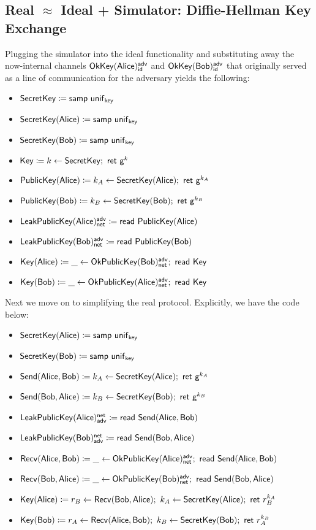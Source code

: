 \subsection{Real $\approx$ Ideal + Simulator: Diffie-Hellman Key Exchange}
Plugging the simulator into the ideal functionality and substituting away the now-internal channels $\mathsf{OkKey}(\mathsf{Alice})^{\mathsf{adv}}_{\mathsf{id}}$ and $\mathsf{OkKey}(\mathsf{Bob})^{\mathsf{adv}}_{\mathsf{id}}$ that originally served as a line of communication for the adversary yields the following:

\begin{itemize}
\item $\mathsf{SecretKey} \coloneqq \mathsf{samp} \ \mathsf{unif}_{\mathsf{key}}$
\item $\mathsf{SecretKey}(\mathsf{Alice}) \coloneqq \mathsf{samp} \ \mathsf{unif}_{\mathsf{key}}$
\item $\mathsf{SecretKey}(\mathsf{Bob}) \coloneqq \mathsf{samp} \ \mathsf{unif}_{\mathsf{key}}$
\item $\mathsf{Key} \coloneqq k \leftarrow \mathsf{SecretKey}; \ \mathsf{ret} \ \mathsf{g}^k$
\item $\mathsf{PublicKey}(\mathsf{Alice}) \coloneqq k_A \leftarrow \mathsf{SecretKey}(\mathsf{Alice}); \ \mathsf{ret} \ \mathsf{g}^{k_A}$
\item $\mathsf{PublicKey}(\mathsf{Bob}) \coloneqq k_B \leftarrow \mathsf{SecretKey}(\mathsf{Bob}); \ \mathsf{ret} \ \mathsf{g}^{k_B}$
\item $\mathsf{LeakPublicKey}(\mathsf{Alice})^{\mathsf{adv}}_{\mathsf{net}} \coloneqq \mathsf{read} \ \mathsf{PublicKey}(\mathsf{Alice})$
\item $\mathsf{LeakPublicKey}(\mathsf{Bob})^{\mathsf{adv}}_{\mathsf{net}} \coloneqq \mathsf{read} \ \mathsf{PublicKey}(\mathsf{Bob})$
\item $\mathsf{Key}(\mathsf{Alice}) \coloneqq \_ \leftarrow \mathsf{OkPublicKey}(\mathsf{Bob})^{\mathsf{adv}}_{\mathsf{net}}; \ \mathsf{read} \ \mathsf{Key}$
\item $\mathsf{Key}(\mathsf{Bob}) \coloneqq \_ \leftarrow \mathsf{OkPublicKey}(\mathsf{Alice})^{\mathsf{adv}}_{\mathsf{net}}; \ \mathsf{read} \ \mathsf{Key}$
\end{itemize}

\noindent Next we move on to simplifying the real protocol.  Explicitly, we have the code below:

\begin{itemize}
\item $\mathsf{SecretKey}(\mathsf{Alice}) \coloneqq \mathsf{samp} \ \mathsf{unif}_{\mathsf{key}}$
\item $\mathsf{SecretKey}(\mathsf{Bob}) \coloneqq \mathsf{samp} \ \mathsf{unif}_{\mathsf{key}}$
\item $\mathsf{Send}(\mathsf{Alice},\mathsf{Bob}) \coloneqq k_A \leftarrow \mathsf{SecretKey}(\mathsf{Alice}); \ \mathsf{ret} \ \mathsf{g}^{k_A}$
\item $\mathsf{Send}(\mathsf{Bob},\mathsf{Alice}) \coloneqq k_B \leftarrow \mathsf{SecretKey}(\mathsf{Bob}); \ \mathsf{ret} \ \mathsf{g}^{k_B}$
\item $\mathsf{LeakPublicKey}(\mathsf{Alice})^{\mathsf{net}}_{\mathsf{adv}} \coloneqq \mathsf{read} \ \mathsf{Send}(\mathsf{Alice},\mathsf{Bob})$
\item $\mathsf{LeakPublicKey}(\mathsf{Bob})^{\mathsf{net}}_{\mathsf{adv}} \coloneqq \mathsf{read} \ \mathsf{Send}(\mathsf{Bob},\mathsf{Alice})$
\item $\Recv(\Alice,\Bob) \coloneqq \_ \leftarrow \OkPublicKey(\Alice)^\adv_\net; \ \read{\Send(\Alice,\Bob)}$
\item $\Recv(\Bob,\Alice) \coloneqq \_ \leftarrow \OkPublicKey(\Bob)^\adv_\net; \ \read{\Send(\Bob,\Alice)}$
\item $\Key(\Alice) \coloneqq r_B \leftarrow \Recv(\Bob,\Alice); \ k_A \leftarrow \SecretKey(\Alice); \ \ret{r_B^{k_A}}$
\item $\Key(\Bob) \coloneqq r_A \leftarrow \Recv(\Alice,\Bob); \ k_B \leftarrow \SecretKey(\Bob); \ \ret{r_A^{k_B}}$
\end{itemize}

